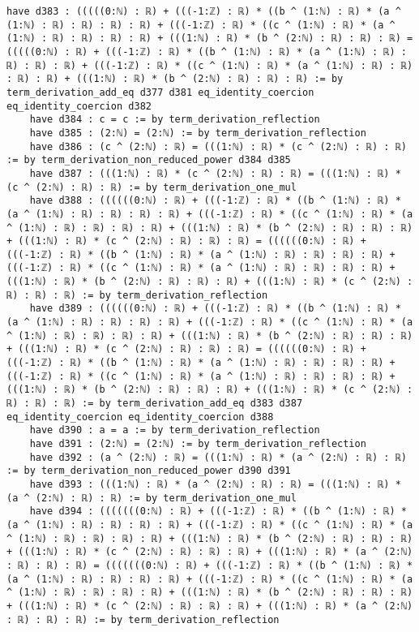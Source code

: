 \documentclass{article}
\begin{document}
\begin{tcolorbox}[colback=white!10, width=\linewidth]
\begin{lstlisting}[language=Lean4]
    have d383 : (((((0:ℕ) : ℝ) + (((-1:ℤ) : ℝ) * ((b ^ (1:ℕ) : ℝ) * (a ^ (1:ℕ) : ℝ) : ℝ) : ℝ) : ℝ) + (((-1:ℤ) : ℝ) * ((c ^ (1:ℕ) : ℝ) * (a ^ (1:ℕ) : ℝ) : ℝ) : ℝ) : ℝ) + (((1:ℕ) : ℝ) * (b ^ (2:ℕ) : ℝ) : ℝ) : ℝ) = (((((0:ℕ) : ℝ) + (((-1:ℤ) : ℝ) * ((b ^ (1:ℕ) : ℝ) * (a ^ (1:ℕ) : ℝ) : ℝ) : ℝ) : ℝ) + (((-1:ℤ) : ℝ) * ((c ^ (1:ℕ) : ℝ) * (a ^ (1:ℕ) : ℝ) : ℝ) : ℝ) : ℝ) + (((1:ℕ) : ℝ) * (b ^ (2:ℕ) : ℝ) : ℝ) : ℝ) := by term_derivation_add_eq d377 d381 eq_identity_coercion eq_identity_coercion d382
    have d384 : c = c := by term_derivation_reflection
    have d385 : (2:ℕ) = (2:ℕ) := by term_derivation_reflection
    have d386 : (c ^ (2:ℕ) : ℝ) = (((1:ℕ) : ℝ) * (c ^ (2:ℕ) : ℝ) : ℝ) := by term_derivation_non_reduced_power d384 d385
    have d387 : (((1:ℕ) : ℝ) * (c ^ (2:ℕ) : ℝ) : ℝ) = (((1:ℕ) : ℝ) * (c ^ (2:ℕ) : ℝ) : ℝ) := by term_derivation_one_mul
    have d388 : ((((((0:ℕ) : ℝ) + (((-1:ℤ) : ℝ) * ((b ^ (1:ℕ) : ℝ) * (a ^ (1:ℕ) : ℝ) : ℝ) : ℝ) : ℝ) + (((-1:ℤ) : ℝ) * ((c ^ (1:ℕ) : ℝ) * (a ^ (1:ℕ) : ℝ) : ℝ) : ℝ) : ℝ) + (((1:ℕ) : ℝ) * (b ^ (2:ℕ) : ℝ) : ℝ) : ℝ) + (((1:ℕ) : ℝ) * (c ^ (2:ℕ) : ℝ) : ℝ) : ℝ) = ((((((0:ℕ) : ℝ) + (((-1:ℤ) : ℝ) * ((b ^ (1:ℕ) : ℝ) * (a ^ (1:ℕ) : ℝ) : ℝ) : ℝ) : ℝ) + (((-1:ℤ) : ℝ) * ((c ^ (1:ℕ) : ℝ) * (a ^ (1:ℕ) : ℝ) : ℝ) : ℝ) : ℝ) + (((1:ℕ) : ℝ) * (b ^ (2:ℕ) : ℝ) : ℝ) : ℝ) + (((1:ℕ) : ℝ) * (c ^ (2:ℕ) : ℝ) : ℝ) : ℝ) := by term_derivation_reflection
    have d389 : ((((((0:ℕ) : ℝ) + (((-1:ℤ) : ℝ) * ((b ^ (1:ℕ) : ℝ) * (a ^ (1:ℕ) : ℝ) : ℝ) : ℝ) : ℝ) + (((-1:ℤ) : ℝ) * ((c ^ (1:ℕ) : ℝ) * (a ^ (1:ℕ) : ℝ) : ℝ) : ℝ) : ℝ) + (((1:ℕ) : ℝ) * (b ^ (2:ℕ) : ℝ) : ℝ) : ℝ) + (((1:ℕ) : ℝ) * (c ^ (2:ℕ) : ℝ) : ℝ) : ℝ) = ((((((0:ℕ) : ℝ) + (((-1:ℤ) : ℝ) * ((b ^ (1:ℕ) : ℝ) * (a ^ (1:ℕ) : ℝ) : ℝ) : ℝ) : ℝ) + (((-1:ℤ) : ℝ) * ((c ^ (1:ℕ) : ℝ) * (a ^ (1:ℕ) : ℝ) : ℝ) : ℝ) : ℝ) + (((1:ℕ) : ℝ) * (b ^ (2:ℕ) : ℝ) : ℝ) : ℝ) + (((1:ℕ) : ℝ) * (c ^ (2:ℕ) : ℝ) : ℝ) : ℝ) := by term_derivation_add_eq d383 d387 eq_identity_coercion eq_identity_coercion d388
    have d390 : a = a := by term_derivation_reflection
    have d391 : (2:ℕ) = (2:ℕ) := by term_derivation_reflection
    have d392 : (a ^ (2:ℕ) : ℝ) = (((1:ℕ) : ℝ) * (a ^ (2:ℕ) : ℝ) : ℝ) := by term_derivation_non_reduced_power d390 d391
    have d393 : (((1:ℕ) : ℝ) * (a ^ (2:ℕ) : ℝ) : ℝ) = (((1:ℕ) : ℝ) * (a ^ (2:ℕ) : ℝ) : ℝ) := by term_derivation_one_mul
    have d394 : (((((((0:ℕ) : ℝ) + (((-1:ℤ) : ℝ) * ((b ^ (1:ℕ) : ℝ) * (a ^ (1:ℕ) : ℝ) : ℝ) : ℝ) : ℝ) + (((-1:ℤ) : ℝ) * ((c ^ (1:ℕ) : ℝ) * (a ^ (1:ℕ) : ℝ) : ℝ) : ℝ) : ℝ) + (((1:ℕ) : ℝ) * (b ^ (2:ℕ) : ℝ) : ℝ) : ℝ) + (((1:ℕ) : ℝ) * (c ^ (2:ℕ) : ℝ) : ℝ) : ℝ) + (((1:ℕ) : ℝ) * (a ^ (2:ℕ) : ℝ) : ℝ) : ℝ) = (((((((0:ℕ) : ℝ) + (((-1:ℤ) : ℝ) * ((b ^ (1:ℕ) : ℝ) * (a ^ (1:ℕ) : ℝ) : ℝ) : ℝ) : ℝ) + (((-1:ℤ) : ℝ) * ((c ^ (1:ℕ) : ℝ) * (a ^ (1:ℕ) : ℝ) : ℝ) : ℝ) : ℝ) + (((1:ℕ) : ℝ) * (b ^ (2:ℕ) : ℝ) : ℝ) : ℝ) + (((1:ℕ) : ℝ) * (c ^ (2:ℕ) : ℝ) : ℝ) : ℝ) + (((1:ℕ) : ℝ) * (a ^ (2:ℕ) : ℝ) : ℝ) : ℝ) := by term_derivation_reflection

\end{lstlisting}
\end{tcolorbox}
\end{document}
